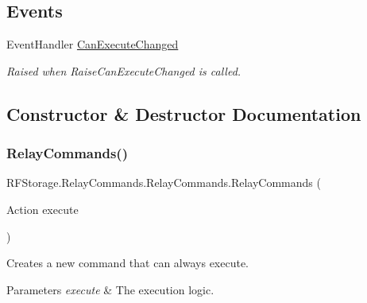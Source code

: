 \subsection*{Events}
\begin{DoxyCompactItemize}
\item 
Event\+Handler \mbox{\hyperlink{class_r_f_storage_1_1_relay_commands_1_1_relay_commands_a7ad91fe956842b7f151d01ee787d38c0}{Can\+Execute\+Changed}}
\begin{DoxyCompactList}\small\item\em Raised when Raise\+Can\+Execute\+Changed is called. \end{DoxyCompactList}\end{DoxyCompactItemize}


\subsection{Constructor \& Destructor Documentation}
\mbox{\label{class_r_f_storage_1_1_relay_commands_1_1_relay_commands_abffa9ab4825fe92e6452d2580ae848ba}} 
\subsubsection{\texorpdfstring{RelayCommands()}{RelayCommands()}\hspace{0.1cm}{\footnotesize\ttfamily [1/2]}}
{\footnotesize\ttfamily R\+F\+Storage.\+Relay\+Commands.\+Relay\+Commands.\+Relay\+Commands (\begin{DoxyParamCaption}\item[{Action}]{execute }\end{DoxyParamCaption})}



Creates a new command that can always execute. 


\begin{DoxyParams}{Parameters}
{\em execute} & The execution logic.\\
\hline
\end{DoxyParams}
\mbox{\label{class_r_f_storage_1_1_relay_commands_1_1_relay_commands_ad33c6e9f573620d9dc0d0d9249b72403}} 
